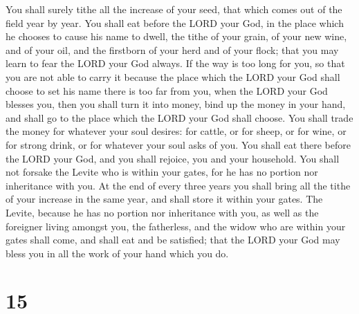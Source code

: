  You shall surely tithe all the increase of your seed, that
which comes out of the field year by year.  You shall eat
before the LORD your God, in the place which he chooses to cause his
name to dwell, the tithe of your grain, of your new wine, and of your
oil, and the firstborn of your herd and of your flock; that you may
learn to fear the LORD your God always.  If the way is too
long for you, so that you are not able to carry it because the place
which the LORD your God shall choose to set his name there is too far
from you, when the LORD your God blesses you,  then you
shall turn it into money, bind up the money in your hand, and shall go
to the place which the LORD your God shall choose.  You
shall trade the money for whatever your soul desires: for cattle, or for
sheep, or for wine, or for strong drink, or for whatever your soul asks
of you. You shall eat there before the LORD your God, and you shall
rejoice, you and your household.  You shall not forsake the
Levite who is within your gates, for he has no portion nor inheritance
with you.  At the end of every three years you shall bring
all the tithe of your increase in the same year, and shall store it
within your gates.  The Levite, because he has no portion
nor inheritance with you, as well as the foreigner living amongst you,
the fatherless, and the widow who are within your gates shall come, and
shall eat and be satisfied; that the LORD your God may bless you in all
the work of your hand which you do.

\hypertarget{section-14}{%
\section{15}\label{section-14}}

